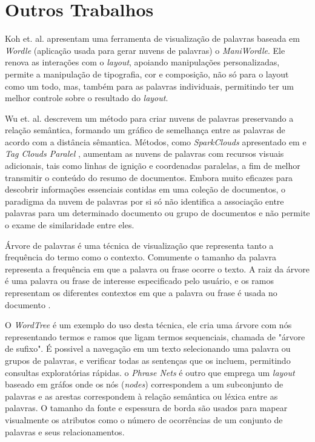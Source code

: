 \section{Outros Trabalhos}

Koh et. al. \cite{koh2010maniwordle} apresentam uma ferramenta de visualização de palavras baseada em \textit{Wordle} (aplicação usada para gerar nuvens de palavras) o \textit{ManiWordle}. Ele renova as interações com o \textit{layout}, apoiando manipulações personalizadas, permite a manipulação de tipografia, cor e composição, não só para o layout como um todo, mas, também para as palavras individuais, permitindo ter um melhor controle sobre o resultado do \textit{layout}. 

Wu et. al. \cite{xu2016semantic} descrevem um método para criar nuvens de palavras preservando a relação semântica, formando um gráfico de semelhança entre as palavras  de acordo com a distância sêmantica. Métodos, como \textit{SparkClouds} apresentado em \cite{lee2010sparkclouds} e \textit{Tag Clouds Paralel} \cite{collins2009parallel}, aumentam as nuvens de palavras com recursos visuais adicionais, tais como linhas de ignição e coordenadas paralelas, a fim de melhor transmitir o conteúdo do resumo de documentos.  Embora muito eficazes para descobrir informações essenciais contidas em uma coleção de documentos, o paradigma da nuvem de palavras por si só não identifica a associação entre palavras para um determinado documento ou grupo de documentos e não permite o exame de similaridade entre eles. 

Árvore de palavras é uma técnica de visualização que representa tanto a frequência do termo como o contexto. Comumente o tamanho da palavra representa a frequência em que a palavra ou frase ocorre o texto.  A raiz da árvore é uma palavra ou frase de interesse especificado pelo usuário, e os ramos representam os diferentes contextos em que a palavra ou frase é usada no documento \cite{ward2015interactive}.

O \textit{WordTree} \cite{wattenberg2008word} é um exemplo do uso desta técnica, ele cria uma árvore com nós representando termos e ramos que ligam termos sequenciais, chamada de "árvore de sufixo". É possivel a navegação em um texto selecionando uma palavra ou grupos de palavras, e verificar todas as sentenças que os incluem, permitindo consultas exploratórias rápidas. o \textit{Phrase Nets} \cite{van2009mapping} é outro que emprega um \textit{layout} baseado em gráfos onde os nós (\textit{nodes}) correspondem a um subconjunto de palavras e as arestas correspondem à relação semântica ou léxica entre as palavras. O tamanho da fonte e espessura de borda são usados para mapear visualmente os atributos como o número de ocorrências de um conjunto de palavras e seus relacionamentos. 

